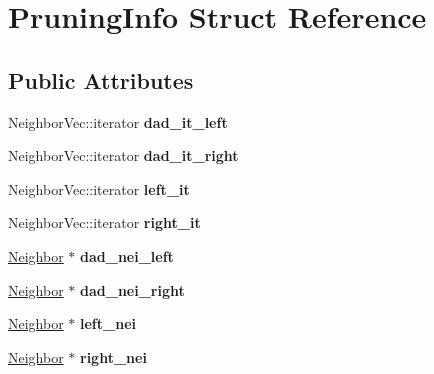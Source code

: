 \hypertarget{structPruningInfo}{
\section{PruningInfo Struct Reference}
\label{structPruningInfo}
}
\subsection*{Public Attributes}
\begin{DoxyCompactItemize}
\item 
\hypertarget{structPruningInfo_a02d6eb38fbbdf135c7dcd6b43e9ac641}{
NeighborVec::iterator {\bfseries dad\_\-it\_\-left}}
\label{structPruningInfo_a02d6eb38fbbdf135c7dcd6b43e9ac641}

\item 
\hypertarget{structPruningInfo_ac0575205e6e906bbff240c2961246456}{
NeighborVec::iterator {\bfseries dad\_\-it\_\-right}}
\label{structPruningInfo_ac0575205e6e906bbff240c2961246456}

\item 
\hypertarget{structPruningInfo_a0dedf64569fe2b8ac4a1bff503667d46}{
NeighborVec::iterator {\bfseries left\_\-it}}
\label{structPruningInfo_a0dedf64569fe2b8ac4a1bff503667d46}

\item 
\hypertarget{structPruningInfo_a64882e04f5fc14dce56037aebaa29cdd}{
NeighborVec::iterator {\bfseries right\_\-it}}
\label{structPruningInfo_a64882e04f5fc14dce56037aebaa29cdd}

\item 
\hypertarget{structPruningInfo_af7052b9a2aaa8b57e2503b595adcd404}{
\hyperlink{classNeighbor}{Neighbor} $\ast$ {\bfseries dad\_\-nei\_\-left}}
\label{structPruningInfo_af7052b9a2aaa8b57e2503b595adcd404}

\item 
\hypertarget{structPruningInfo_a3c84954be0d5d9513782dc1b22c0f618}{
\hyperlink{classNeighbor}{Neighbor} $\ast$ {\bfseries dad\_\-nei\_\-right}}
\label{structPruningInfo_a3c84954be0d5d9513782dc1b22c0f618}

\item 
\hypertarget{structPruningInfo_a925d453486d7bac4b268779b84893f60}{
\hyperlink{classNeighbor}{Neighbor} $\ast$ {\bfseries left\_\-nei}}
\label{structPruningInfo_a925d453486d7bac4b268779b84893f60}

\item 
\hypertarget{structPruningInfo_aa34ac9fa1918c261d606279436e1b2b8}{
\hyperlink{classNeighbor}{Neighbor} $\ast$ {\bfseries right\_\-nei}}
\label{structPruningInfo_aa34ac9fa1918c261d606279436e1b2b8}


\end{DoxyCompactItemize}
